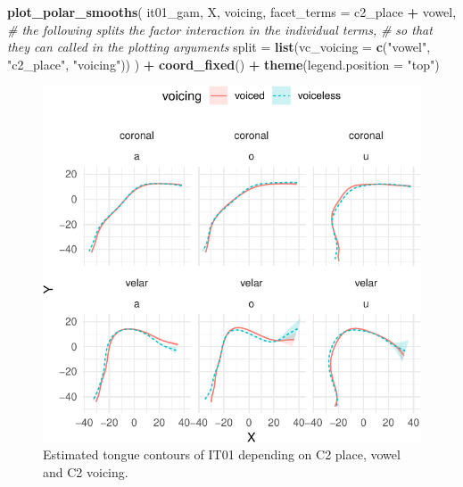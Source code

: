 \documentclass[12pt,]{article}
\newenvironment{Shaded}{\begin{snugshade}}{\end{snugshade}}
\newcommand{\CommentTok}[1]{\textcolor[rgb]{0.56,0.35,0.01}{\textit{#1}}}
\newcommand{\DataTypeTok}[1]{\textcolor[rgb]{0.13,0.29,0.53}{#1}}
\newcommand{\KeywordTok}[1]{\textcolor[rgb]{0.13,0.29,0.53}{\textbf{#1}}}
\newcommand{\NormalTok}[1]{#1}
\newcommand{\OperatorTok}[1]{\textcolor[rgb]{0.81,0.36,0.00}{\textbf{#1}}}
\newcommand{\StringTok}[1]{\textcolor[rgb]{0.31,0.60,0.02}{#1}}
\begin{document}
\begin{Shaded}
\begin{Highlighting}[]
\KeywordTok{plot_polar_smooths}\NormalTok{(}
\NormalTok{  it01_gam,}
\NormalTok{  X,}
\NormalTok{  voicing,}
  \DataTypeTok{facet_terms =}\NormalTok{ c2_place }\OperatorTok{+}\StringTok{ }\NormalTok{vowel,}
  \CommentTok{# the following splits the factor interaction in the individual terms,}
  \CommentTok{# so that they can called in the plotting arguments}
  \DataTypeTok{split =} \KeywordTok{list}\NormalTok{(}\DataTypeTok{vc_voicing =} \KeywordTok{c}\NormalTok{(}\StringTok{"vowel"}\NormalTok{, }\StringTok{"c2_place"}\NormalTok{, }\StringTok{"voicing"}\NormalTok{))}
\NormalTok{) }\OperatorTok{+}
\StringTok{  }\KeywordTok{coord_fixed}\NormalTok{() }\OperatorTok{+}
\StringTok{  }\KeywordTok{theme}\NormalTok{(}\DataTypeTok{legend.position =} \StringTok{"top"}\NormalTok{)}
\end{Highlighting}
\end{Shaded}

\begin{figure}

{\centering \includegraphics[width=\linewidth]{2018-polar-gam_files/figure-latex/it01-gam-plot-1} 

}

\caption{Estimated tongue contours of IT01 depending on C2 place, vowel and C2 voicing.}\label{f:it01-gam-plot}
\end{figure}
\end{document}
